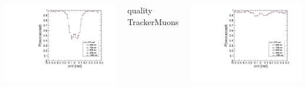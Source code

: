 \documentclass[compress]{beamer}
\begin{document}
\begin{frame}
\begin{columns}
\includegraphics[width=\linewidth]{endcap_dr_GlobalMuon.pdf}

\centering quality TrackerMuons

\includegraphics[width=\linewidth]{endcap_dr_TrackerMuon.pdf}
\end{columns}
\end{frame}
\end{document}
